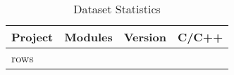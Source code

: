 \begin{table}[h]
\centering
\begin{tabular}{|l|r|l|r|}
\hline
\textbf{Project} & \textbf{Modules} & \textbf{Version} & \textbf{C/C++} \\
\hline
{rows}
\hline
\end{tabular}
\caption{Dataset Statistics}
\label{tab:dataset_stats}
\end{table}

